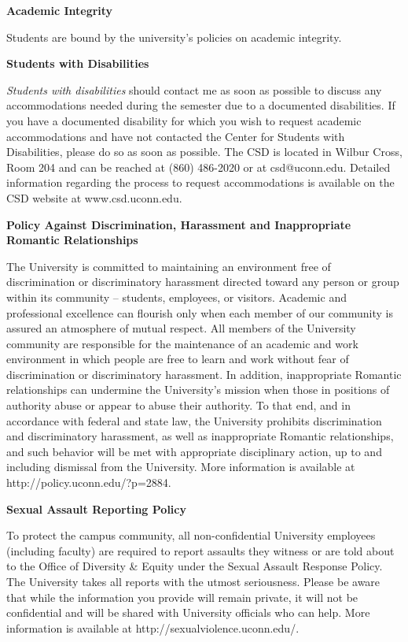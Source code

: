 \documentclass[12pt]{article}
\begin{document}
{\bf Academic Integrity} 

Students are bound by the university's policies on academic integrity.

{\bf Students with Disabilities}

{\it Students with disabilities} should contact me as soon as
possible to discuss any accommodations needed during the semester due
to a documented disabilities.  If you have a documented disability for
which you wish to request academic accommodations and have not
contacted the Center for Students with Disabilities, please do so as
soon as possible.  The CSD is located in Wilbur Cross, Room 204 and
can be reached at (860) 486-2020 or at csd@uconn.edu.  Detailed
information regarding the process to request accommodations is
available on the CSD website at www.csd.uconn.edu.  

{\bf Policy Against Discrimination, Harassment and Inappropriate
Romantic Relationships}

The University is committed to maintaining an environment free of
discrimination or discriminatory harassment directed toward any person
or group within its community – students, employees, or visitors.
Academic and professional excellence can flourish only when each
member of our community is assured an atmosphere of mutual respect.
All members of the University community are responsible for the
maintenance of an academic and work environment in which people are
free to learn and work without fear of discrimination or
discriminatory harassment.  In addition, inappropriate Romantic
relationships can undermine the University’s mission when those in
positions of authority abuse or appear to abuse their authority.  To
that end, and in accordance with federal and state law, the University
prohibits discrimination and discriminatory harassment, as well as
inappropriate Romantic relationships, and such behavior will be met
with appropriate disciplinary action, up to and including dismissal
from the University.  More information is available at
http://policy.uconn.edu/?p=2884.

{\bf Sexual Assault Reporting Policy}

To protect the campus community, all non-confidential University
employees (including faculty) are required to report assaults they
witness or are told about to the Office of Diversity \& Equity under
the Sexual Assault Response Policy.  The University takes all reports
with the utmost seriousness.  Please be aware that while the
information you provide will remain private, it will not be
confidential and will be shared with University officials who can
help.  More information is available at
http://sexualviolence.uconn.edu/.
\end{document}
